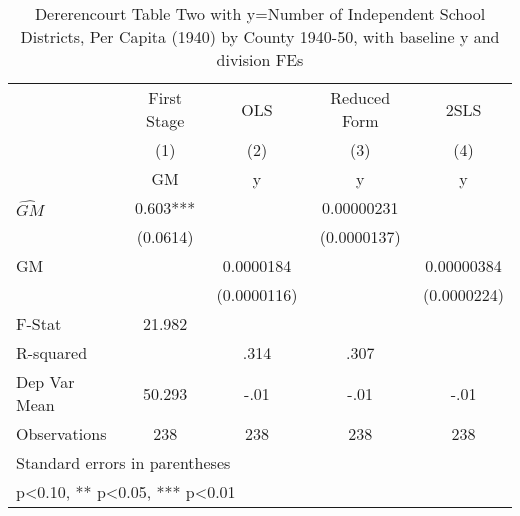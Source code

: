 \begin{table}[htbp]\centering
\def\sym#1{\ifmmode^{#1}\else\(^{#1}\)\fi}
\caption{Dererencourt Table Two with y=Number of Independent School Districts, Per Capita (1940) by County 1940-50, with baseline y and division FEs}
\begin{tabular}{l*{4}{c}}
\toprule
                    & First Stage   &         OLS   &Reduced Form   &        2SLS   \\
                    &\multicolumn{1}{c}{(1)}&\multicolumn{1}{c}{(2)}&\multicolumn{1}{c}{(3)}&\multicolumn{1}{c}{(4)}\\
                    &\multicolumn{1}{c}{GM}&\multicolumn{1}{c}{y}&\multicolumn{1}{c}{y}&\multicolumn{1}{c}{y}\\
\midrule
$\hat{GM}$          &       0.603***&               &  0.00000231   &               \\
                    &    (0.0614)   &               & (0.0000137)   &               \\
\addlinespace
GM                  &               &   0.0000184   &               &  0.00000384   \\
                    &               & (0.0000116)   &               & (0.0000224)   \\
\midrule
F-Stat              &      21.982   &               &               &               \\
R-squared           &               &        .314   &        .307   &               \\
Dep Var Mean        &      50.293   &        -.01   &        -.01   &        -.01   \\
Observations        &         238   &         238   &         238   &         238   \\
\bottomrule
\multicolumn{5}{l}{\footnotesize Standard errors in parentheses}\\
\multicolumn{5}{l}{\footnotesize * p<0.10, ** p<0.05, *** p<0.01}\\
\end{tabular}
\end{table}
